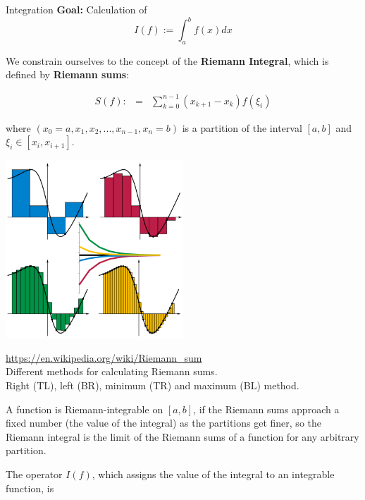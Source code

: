 \documentclass[11pt,compress,t,notes=noshow, xcolor=table]{beamer}
\begin{document}
\begin{vbframe}{Integration}
\textbf{Goal:} Calculation of
$$
I(f) := \int_a^b f(x)dx
$$

\lz

We constrain ourselves to the concept of the \textbf{Riemann Integral}, which is defined by \textbf{Riemann sums}:

\begin{eqnarray*}
S(f) :&=& \sum_{k=0}^{n-1}(x_{k+1} - x_k) f(\xi_i)
\end{eqnarray*}

where $(x_0 = a, x_1, x_2, ..., x_{n-1}, x_n = b)$ is a partition of the interval $[a, b]$ and $\xi_i \in [x_i, x_{i+1}]$.

\framebreak

\begin{center}
\includegraphics[width = 0.5\textwidth]{figure_man/riemannsums.png} \\
\begin{footnotesize}
\url{https://en.wikipedia.org/wiki/Riemann_sum}\\
Different methods for calculating Riemann sums.\\
Right (TL), left (BR), minimum (TR) and maximum (BL) method.

\end{footnotesize}
\end{center}

\framebreak

A function is Riemann-integrable on $[a, b]$, if the Riemann sums approach a fixed number (the value of the integral) as the partitions get finer, so the Riemann integral is the limit of the Riemann sums of a function for any arbitrary partition.

\lz

The operator $I(f)$, which assigns the value of the integral to an integrable function, is


\end{vbframe}
\end{document}
